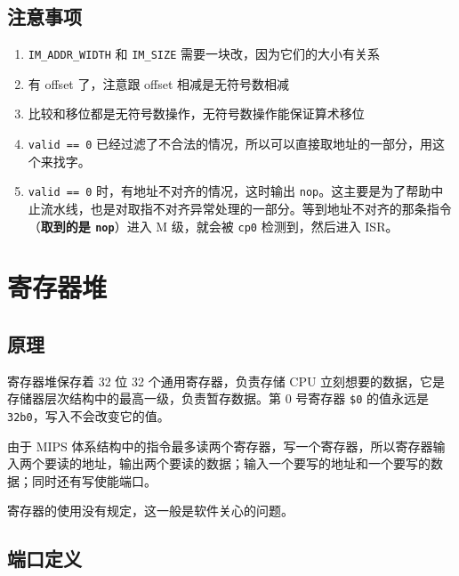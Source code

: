 \documentclass[12pt,AutoFakeBold,AutoFakeSlant]{article}
\providecommand{\tightlist}{%
  \setlength{\itemsep}{0pt}\setlength{\parskip}{0pt}}
\newcommand{\ms}[1]{\texttt{#1}}
\begin{document}
\hypertarget{ux6ce8ux610fux4e8bux9879-2}{%
\subsection{注意事项}\label{ux6ce8ux610fux4e8bux9879-2}}

\begin{enumerate}
\def\labelenumi{\arabic{enumi}.}
\tightlist
\item
  \texttt{IM\_ADDR\_WIDTH} 和 \texttt{IM\_SIZE}
  需要一块改，因为它们的大小有关系
\item
  有 offset 了，注意跟 offset 相减是无符号数相减
\item
  比较和移位都是无符号数操作，无符号数操作能保证算术移位
\item
  \ms{valid == 0} 已经过滤了不合法的情况，所以可以直接取地址的一部分，用这个来找字。
\item
  \ms{valid == 0} 时，有地址不对齐的情况，这时输出 \ms{nop}。这主要是为了帮助中止流水线，也是对取指不对齐异常处理的一部分。等到地址不对齐的那条指令（\textbf{取到的是 \ms{nop}}）进入 M 级，就会被 \ms{cp0} 检测到，然后进入 ISR。
\end{enumerate}

\hypertarget{ux5bc4ux5b58ux5668ux5806}{%
\section{寄存器堆}\label{ux5bc4ux5b58ux5668ux5806}}

\hypertarget{ux539fux7406-3}{%
\subsection{原理}\label{ux539fux7406-3}}

寄存器堆保存着 32 位 32 个通用寄存器，负责存储 CPU
立刻想要的数据，它是存储器层次结构中的最高一级，负责暂存数据。第 0
号寄存器 \texttt{\$0} 的值永远是
\texttt{32\textquotesingle{}b0}，写入不会改变它的值。

由于 MIPS
体系结构中的指令最多读两个寄存器，写一个寄存器，所以寄存器输入两个要读的地址，输出两个要读的数据；输入一个要写的地址和一个要写的数据；同时还有写使能端口。

寄存器的使用没有规定，这一般是软件关心的问题。

\hypertarget{ux7aefux53e3ux5b9aux4e49-2}{%
\subsection{端口定义}\label{ux7aefux53e3ux5b9aux4e49-2}}
\end{document}
